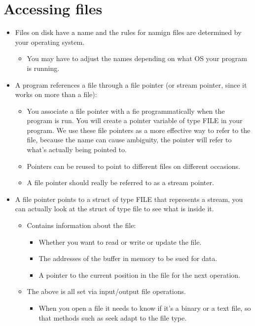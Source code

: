 \section{Accessing files}
\begin{itemize}
    \item Files on disk have a name and the rules for namign files are determined by your operating system.
        \begin{itemize}
            \item You may have to adjust the names depending on what OS your program is running.
        \end{itemize}
    
    \item A program references a file through a file pointer (or stream pointer, since it works on more than a file):
        \begin{itemize}
            \item You associate a file pointer with a fie programmatically when the program is run. You will create a pointer variable of type FILE in your program. We use these file pointers as a more effective way to refer to the file, because the name can cause ambiguity, the pointer will refer to what's actually being pointed to. 
            \item Pointers can be reused to point to different files on different occasions.
            \item A file pointer should really be referred to as a stream pointer.
        \end{itemize}
    
    \item A file pointer points to a struct of type FILE that represents a stream, you can actually look at the struct of type file to see what is inside it.
        \begin{itemize}
            \item Contains information about the file:
                \begin{itemize}
                    \item Whether you want to read or write or update the file.
                    \item The addresses of the buffer in memory to be sued for data.
                    \item A pointer to the current position in the file for the next operation.
                \end{itemize}
            
            \item The above is all set via input/output file operations.
                \begin{itemize}
                    \item When you open a file it needs to know if it's a binary or a text file, so that methods such as seek adapt to the file type.
                \end{itemize}
        \end{itemize}
    

\end{itemize}
